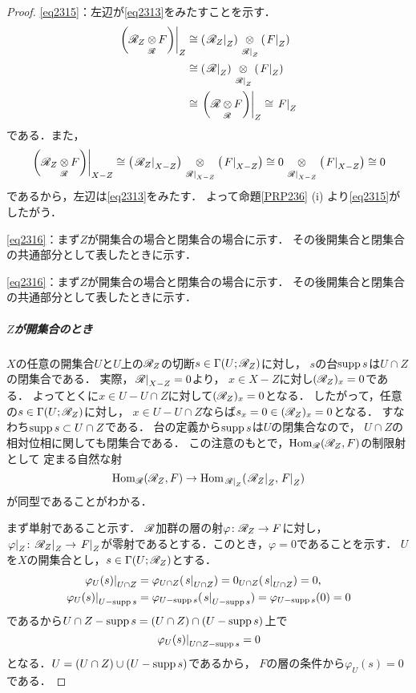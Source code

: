 \begin{proof}
    \eqref{eq2315}：左辺が\eqref{eq2313}をみたすことを示す．
    \begin{align*}
        \mres[{\left(\scR_{Z}\ttens[\scR]F\right)}]{Z}
        &\cong
        \left(\mres[\scR_{Z}]{Z}\right)\ttens[{\mres[\scR]{Z}}]\left(\mres[F]{Z}\right)\\
        &\cong
        \left(\mres[\scR]{Z}\right)\ttens[{\mres[\scR]{Z}}]\left(\mres[F]{Z}\right)\\
        &\cong
        \mres[{\left(\scR\ttens[\scR]F\right)}]{Z}
        \cong
        \mres[F]{Z}
    \end{align*}
    である．また，\[
        \mres[{\left(\scR_{Z}\ttens[\scR]F\right)}]{X-Z}
        \cong
        \left(\mres[\scR_{Z}]{X-Z}\right)\ttens[{\mres[\scR]{X-Z}}]\left(\mres[F]{X-Z}\right)
        \cong
        0\ttens[{\mres[\scR]{X-Z}}]\left(\mres[F]{X-Z}\right)
        \cong
        0
    \]
    であるから，左辺は\eqref{eq2313}をみたす．
    よって命題\ref{PRP236} (i) より\eqref{eq2315}がしたがう．

    \eqref{eq2316}：まず\(Z\)が開集合の場合と閉集合の場合に示す．
    その後開集合と閉集合の共通部分として表したときに示す．

    \eqref{eq2316}：まず\(Z\)が開集合の場合と閉集合の場合に示す．
    その後開集合と閉集合の共通部分として表したときに示す．

    \subparagraph*{\(Z\)が開集合のとき}
    \(X\)の任意の開集合\(U\)と\(U\)上の\(\scR_Z\)の切断\(
        s\in \Gamma(U;\scR_Z)
    \)に対し，
    \(s\)の台\(\supp{s}\)は\(U\cap Z\)の閉集合である．
    実際，\(\mres[\scR]{X-Z}=0\)より，
    \(x\in X-Z\)に対し\((\scR_Z)_x=0\)である．
    よってとくに\(x\in U-U\cap Z\)に対して\((\scR_Z)_x=0\)となる．
    したがって，任意の\(s\in\Gamma(U;\scR_Z)\)に対し，
    \(x\in U-U\cap Z\)ならば\(s_x=0\in(\scR_Z)_x=0\)となる．
    すなわち\(\supp{s}\subset U\cap Z\)である．
    台の定義から\(\supp{s}\)は\(U\)の閉集合なので，
    \(U\cap Z\)の相対位相に関しても閉集合である．
    この注意のもとで，\(\Hom_{\scR}(\scR_Z,F)\)の制限射として
    定まる自然な射\[
        \Hom_{\scR}(\scR_Z,F)
        \to
        \Hom_{\mres[\scR]{Z}}(\mres[\scR_Z]{Z},\mres[F]{Z})
    \]が同型であることがわかる．
    
    まず単射であること示す．
    \(\scR\)加群の層の射\(\varphi\colon\scR_Z\to F\)に対し，
    \(  
        \mres[\varphi]{Z}\colon\mres[\scR_Z]{Z}\to\mres[F]{Z}
    \)が零射であるとする．このとき，\(\varphi=0\)であることを示す．
    \(U\)を\(X\)の開集合とし，\(s\in\Gamma(U;\scR_Z)\)とする．
    \begin{align*}
        \mres[\varphi_U(s)]{U\cap Z}
        &=\varphi_{U\cap Z}(\mres[s]{U\cap Z})
        =0_{U\cap Z}(\mres[s]{U\cap Z})=0,\\
        \mres[\varphi_U(s)]{U-\supp{s}}
        &=\varphi_{U-\supp{s}}(\mres[s]{U-\supp{s}})
        =\varphi_{U-\supp{s}}(0)=0
    \end{align*}
    であるから\(U\cap Z-\supp{s}=(U\cap Z)\cap(U-\supp{s})\)上で
    \[
        \mres[\varphi_U(s)]{U\cap Z-\supp{s}}=0
    \]となる．\(U=(U\cap Z)\cup(U-\supp{s})\)であるから，
    \(F\)の層の条件から\(\varphi_U(s)=0\)である．


\end{proof}
